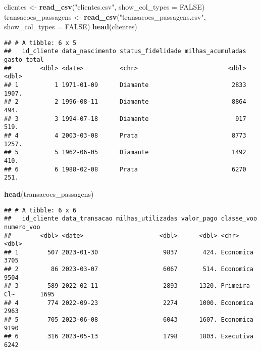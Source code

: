 \documentclass[
]{article}
\newenvironment{Shaded}{\begin{snugshade}}{\end{snugshade}}
\newcommand{\AttributeTok}[1]{\textcolor[rgb]{0.13,0.29,0.53}{#1}}
\newcommand{\ConstantTok}[1]{\textcolor[rgb]{0.56,0.35,0.01}{#1}}
\newcommand{\FunctionTok}[1]{\textcolor[rgb]{0.13,0.29,0.53}{\textbf{#1}}}
\newcommand{\NormalTok}[1]{#1}
\newcommand{\OtherTok}[1]{\textcolor[rgb]{0.56,0.35,0.01}{#1}}
\newcommand{\StringTok}[1]{\textcolor[rgb]{0.31,0.60,0.02}{#1}}
\begin{document}
\begin{Shaded}
\begin{Highlighting}[]
\NormalTok{clientes }\OtherTok{\textless{}{-}} \FunctionTok{read\_csv}\NormalTok{(}\StringTok{"clientes.csv"}\NormalTok{, }\AttributeTok{show\_col\_types =} \ConstantTok{FALSE}\NormalTok{)}
\NormalTok{transacoes\_passagens }\OtherTok{\textless{}{-}} \FunctionTok{read\_csv}\NormalTok{(}\StringTok{"transacoes\_passagens.csv"}\NormalTok{, }\AttributeTok{show\_col\_types =} \ConstantTok{FALSE}\NormalTok{)}
\FunctionTok{head}\NormalTok{(clientes)}
\end{Highlighting}
\end{Shaded}

\begin{verbatim}
## # A tibble: 6 x 5
##   id_cliente data_nascimento status_fidelidade milhas_acumuladas gasto_total
##        <dbl> <date>          <chr>                         <dbl>       <dbl>
## 1          1 1971-01-09      Diamante                       2833       1907.
## 2          2 1996-08-11      Diamante                       8864        494.
## 3          3 1994-07-18      Diamante                        917        519.
## 4          4 2003-03-08      Prata                          8773       1257.
## 5          5 1962-06-05      Diamante                       1492        410.
## 6          6 1988-02-08      Prata                          6270        251.
\end{verbatim}

\begin{Shaded}
\begin{Highlighting}[]
\FunctionTok{head}\NormalTok{(transacoes\_passagens)}
\end{Highlighting}
\end{Shaded}

\begin{verbatim}
## # A tibble: 6 x 6
##   id_cliente data_transacao milhas_utilizadas valor_pago classe_voo   numero_voo
##        <dbl> <date>                     <dbl>      <dbl> <chr>             <dbl>
## 1        507 2023-01-30                  9837       424. Economica          3705
## 2         86 2023-03-07                  6067       514. Economica          9504
## 3        589 2022-02-11                  2893      1320. Primeira Cl~       1695
## 4        774 2022-09-23                  2274      1000. Economica          2963
## 5        705 2023-06-08                  6043      1607. Economica          9190
## 6        316 2023-05-13                  1798      1803. Executiva          6242
\end{verbatim}
\end{document}
